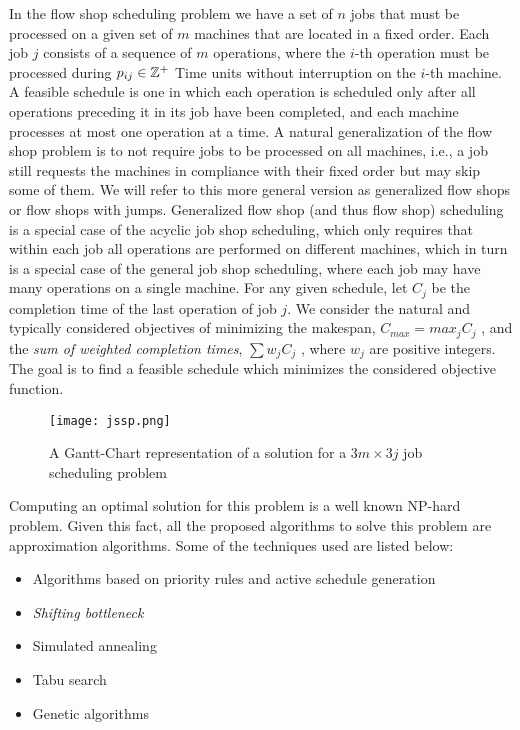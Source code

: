 \begin{definition}
In the flow shop scheduling problem we have a set of $n$ jobs that must be
processed on a given set of $m$ machines that are located in a fixed order. Each
job $j$ consists of a sequence of $m$ operations, where the $i$-th operation
must be processed during $p_{ij} \in \mathbb{Z}^{+}$ Time units without interruption on
the $i$-th machine. A feasible schedule is one in which each operation is
scheduled only after all operations preceding it in its job have been completed,
and each machine processes at most one operation at a time. A natural
generalization of the flow shop problem is to not require jobs to be processed
on all machines, i.e., a job still requests the machines in compliance with
their fixed order but may skip some of them. We will refer to this more general
version as generalized flow shops or flow shops with jumps. Generalized flow
shop (and thus flow shop) scheduling is a special case of the acyclic job shop
scheduling, which only requires that within each job all operations are
performed on different machines, which in turn is a special case of the general
job shop scheduling, where each job may have many operations on a single
machine. For any given schedule, let $C_j$ be the completion time of the last
operation of job $j$. We consider the natural and typically considered
objectives of minimizing the makespan, $C_{max} = max_j C_j$ , and the
\textit{sum of weighted completion times}, $\sum w_jC_j$ , where $w_j$ are
positive integers. The goal is to find a feasible schedule which minimizes the
considered objective function.
\end{definition}

\begin{figure}
\begin{center}
\texttt{[image: jssp.png]}
\caption{ A Gantt-Chart representation of a solution for a $3m \times 3j$ job scheduling problem\cite{geneticbook}}
\label{fig:jssp}
\end{center}
\end{figure}

Computing an optimal solution for this problem is a well known NP-hard
problem\cite{nphard}. Given this fact, all the proposed algorithms to solve this
problem are approximation algorithms. Some of the techniques used are listed
below:

\begin{itemize}
\item Algorithms based on priority rules and active schedule generation
\item \textit{Shifting bottleneck}
\item Simulated annealing
\item Tabu search
\item Genetic algorithms
\end{itemize}

